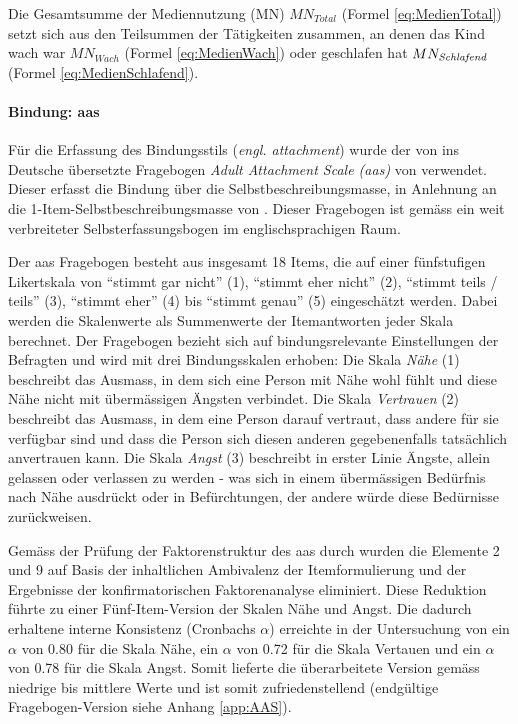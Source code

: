 Die Gesamtsumme der Mediennutzung (MN) $MN_{Total}$ (Formel \ref{eq:MedienTotal}) setzt sich aus den Teilsummen der Tätigkeiten zusammen, an denen das Kind wach war $MN_{Wach}$ (Formel \ref{eq:MedienWach}) oder geschlafen hat $MN_{\text{\textit{Schlafend}}}$ (Formel \ref{eq:MedienSchlafend}).


\paragraph{Bindung: \acrfull{aas}}\label{sec:AAS}
Für die Erfassung des Bindungsstils (\textit{engl. attachment}) wurde der von  ins Deutsche übersetzte Fragebogen \textit{Adult Attachment Scale (\acrshort{aas})} von  verwendet. Dieser erfasst die Bindung über die Selbstbeschreibungsmasse, in Anlehnung an die 1-Item-Selbst\-beschreibungs\-masse von . Dieser Fragebogen ist gemäss  ein weit verbreiteter Selbst\-erfassungs\-bogen im englisch\-sprachigen Raum.

Der \acrshort{aas} Fragebogen besteht aus insgesamt 18 Items, die auf einer fünfstufigen Likert\-skala von \enquote{stimmt gar nicht} (1), \enquote{stimmt eher nicht} (2), \enquote{stimmt teils / teils} (3), \enquote{stimmt eher} (4) bis \enquote{stimmt genau} (5) eingeschätzt werden. Dabei werden die Skalenwerte als Summenwerte der Itemantworten jeder Skala berechnet. Der Fragebogen bezieht sich auf bindungsrelevante Einstellungen der Befragten und wird mit drei Bindungsskalen erhoben: Die Skala \textit{Nähe} (1) beschreibt das Ausmass, in dem sich eine Person mit Nähe wohl fühlt und diese Nähe nicht mit übermässigen Ängsten verbindet. Die Skala \textit{Vertrauen} (2) beschreibt das Ausmass, in dem eine Person darauf vertraut, dass andere für sie verfügbar sind und dass die Person sich diesen anderen gegebenenfalls tatsächlich anvertrauen kann. Die Skala \textit{Angst} (3) beschreibt in erster Linie Ängste, allein gelassen oder verlassen zu werden - was sich in einem übermässigen Bedürfnis nach Nähe ausdrückt oder in Befürchtungen, der andere würde diese Bedürnisse zurückweisen. 

Gemäss der Prüfung der Faktorenstruktur des \acrshort{aas} durch  wurden die Elemente 2 und 9 auf Basis der inhaltlichen Ambivalenz der Itemformulierung und der Ergebnisse der konfirmatorischen Faktorenanalyse eliminiert. Diese Reduktion führte zu einer Fünf-Item-Version der Skalen Nähe und Angst. Die dadurch erhaltene interne Konsistenz (Cronbachs $\alpha$) erreichte in der Untersuchung von  ein $\alpha$ von 0.80 für die Skala Nähe, ein $\alpha$ von 0.72 für die Skala Vertauen und ein $\alpha$ von 0.78 für die Skala Angst. Somit lieferte die überarbeitete Version gemäss  niedrige bis mittlere Werte und ist somit zufriedenstellend (endgültige Fragebogen-Version siehe Anhang \ref{app:AAS}).

